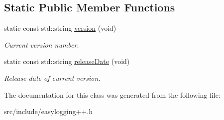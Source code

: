 \subsection*{Static Public Member Functions}
\begin{DoxyCompactItemize}
\item 
\mbox{\label{classel_1_1_version_info_a6fee512d52168445b2118ff2b31b4058}} 
static const std\+::string \hyperlink{classel_1_1_version_info_a6fee512d52168445b2118ff2b31b4058}{version} (void)
\begin{DoxyCompactList}\small\item\em Current version number. \end{DoxyCompactList}\item 
\mbox{\label{classel_1_1_version_info_ab23c2545115898f4071fa4e125204946}} 
static const std\+::string \hyperlink{classel_1_1_version_info_ab23c2545115898f4071fa4e125204946}{release\+Date} (void)
\begin{DoxyCompactList}\small\item\em Release date of current version. \end{DoxyCompactList}\end{DoxyCompactItemize}


The documentation for this class was generated from the following file\+:\begin{DoxyCompactItemize}
\item 
src/include/easylogging++.\+h\end{DoxyCompactItemize}
